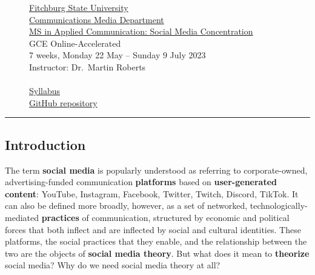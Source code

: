 \documentclass[
  letterpaper,
  DIV=11,
  numbers=noendperiod]{scrartcl}
\begin{document}
\begin{figure}
\begin{minipage}[t]{0.49\linewidth}
{\href{https://fitchburgstate.edu}{Fitchburg State University}\\
\href{https://www.fitchburgstate.edu/academics/academic-schools/school-arts-and-sciences/communications-media-department}{Communications
Media Department}\\
\href{https://www.fitchburgstate.edu/academics/programs/social-media-concentration-applied-communication-ms-online}{MS
in Applied Communication: Social Media Concentration}\\
GCE Online-Accelerated\\
7 weeks, Monday 22 May -- Sunday 9 July 2023\\
Instructor: Dr.~Martin Roberts\\
\href{mailto:mrober40@fitchburgstate.edu}{} \textbar{}
\href{https://github.com/mroberts1/}{} \textbar{}
\href{https://twitter.com/mroberts_fsu}{}\\
\href{https://mroberts1.github.io/social-media-theory-summer-2023}{Syllabus}\\
\href{https://github.com/mroberts1/social-media-theory-summer-2023}{GitHub
repository}

}

\end{minipage}%

\end{figure}

\begin{center}\rule{0.5\linewidth}{0.5pt}\end{center}

\hypertarget{introduction}{%
\subsection{Introduction}\label{introduction}}

The term \textbf{social media} is popularly understood as referring to
corporate-owned, advertising-funded communication \textbf{platforms}
based on \textbf{user-generated content}: YouTube, Instagram, Facebook,
Twitter, Twitch, Discord, TikTok. It can also be defined more broadly,
however, as a set of networked, technologically-mediated
\textbf{practices} of communication, structured by economic and
political forces that both inflect and are inflected by social and
cultural identities. These platforms, the social practices that they
enable, and the relationship between the two are the objects of
\textbf{social media theory}. But what does it mean to \textbf{theorize}
social media? Why do we need social media theory at all?
\end{document}
